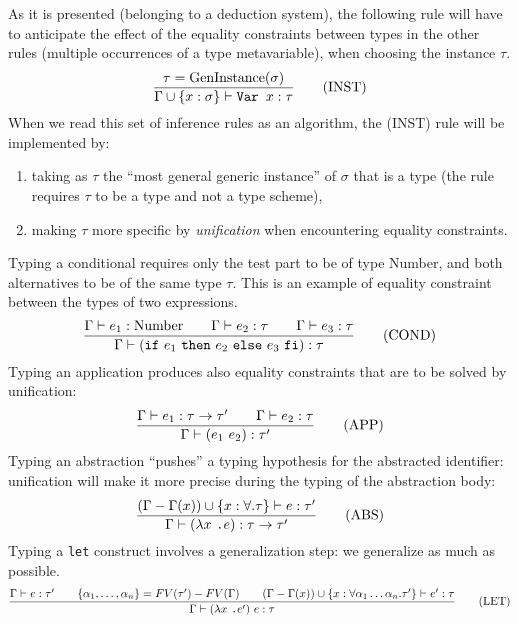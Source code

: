 As it is presented (belonging to a deduction system), the following
rule will have to anticipate the effect of the equality constraints
between types in the other rules (multiple occurrences of a type
metavariable), when choosing the instance $\tau$.
\[
\frac{ \tau = \mbox{GenInstance}(\sigma)}
{\Gamma \cup \{x :\sigma\} \vdash \mbox{\tt Var } x : \tau}\mbox{\qquad(INST)}
\]
When we read
this set of inference rules as an algorithm, the (INST) rule will be
implemented by:
\begin{enumerate}
\item taking as $\tau$ the ``most general generic instance'' of $\sigma$
that is a type (the rule requires $\tau$ to be a type and not a type scheme),
\item making $\tau$ more specific by {\em unification} \cite{Unification}
when encountering equality constraints.
\end{enumerate}
Typing a conditional requires only the test part to be of type Number,
and both alternatives to be of the same type $\tau$. This is an
example of equality constraint between the types of two expressions.
\[\frac{\Gamma \vdash e_1:\mbox{Number} \qquad
      \Gamma \vdash e_2:\tau \qquad
      \Gamma \vdash e_3:\tau}
{\Gamma \vdash (\mbox{\tt if}~ e_1 ~\mbox{\tt then}~e_2~
           \mbox{\tt else}~ e_3~\mbox{\tt fi}) : \tau}\mbox{\qquad(COND)}
\]
Typing an application produces also equality constraints that are to
be solved by unification:
\[
\frac{\Gamma \vdash e_1: \tau \rightarrow \tau' \qquad
      \Gamma \vdash e_2: \tau}
{        \Gamma \vdash (e_1~e_2) : \tau'}\mbox{\qquad(APP)}
\]
Typing an abstraction ``pushes'' a typing hypothesis for the
abstracted identifier: unification will make it more precise during
the typing of the abstraction body:
\[
\frac{(\Gamma-\Gamma(x)) \cup \{x:\forall.\tau\} \vdash e : \tau'}
{\Gamma \vdash (\lambda  x~ \mbox{\tt .} e) : \tau \rightarrow \tau'}
                                                             \mbox{\qquad(ABS)}
\]
Typing a {\tt let} construct involves a generalization step: we generalize
as much as possible.
\[
\frac{
        \Gamma \vdash e:\tau' \qquad
        \{\alpha_1,\ldots,\alpha_n\} = FV(\tau')-FV(\Gamma) \qquad
      (\Gamma-\Gamma(x)) \cup \{x:\forall \alpha_1\ldots\alpha_n. \tau'\}
                  \vdash e':\tau}
{\Gamma \vdash (\lambda  x~ \mbox{\tt .} e')~ e : \tau}\mbox{\qquad(LET)}
\]

